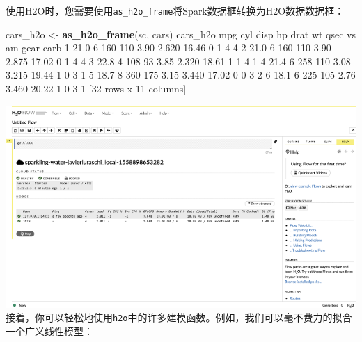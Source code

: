 \documentclass[
]{article}
\newenvironment{Shaded}{\begin{snugshade}}{\end{snugshade}}
\newcommand{\DecValTok}[1]{\textcolor[rgb]{0.00,0.00,0.81}{#1}}
\newcommand{\FloatTok}[1]{\textcolor[rgb]{0.00,0.00,0.81}{#1}}
\newcommand{\KeywordTok}[1]{\textcolor[rgb]{0.13,0.29,0.53}{\textbf{#1}}}
\newcommand{\NormalTok}[1]{#1}
\newcommand{\StringTok}[1]{\textcolor[rgb]{0.31,0.60,0.02}{#1}}
\begin{document}
使用H2O时，您需要使用\texttt{as\_h2o\_frame}将Spark数据框转换为H2O数据数据框：

\begin{Shaded}
\begin{Highlighting}[]
\NormalTok{cars_h2o <-}\StringTok{ }\KeywordTok{as_h2o_frame}\NormalTok{(sc, cars)}
\NormalTok{cars_h2o}
\NormalTok{ mpg cyl disp hp drat wt qsec vs am gear carb}
\DecValTok{1} \FloatTok{21.0} \DecValTok{6} \DecValTok{160} \DecValTok{110} \FloatTok{3.90} \FloatTok{2.620} \FloatTok{16.46} \DecValTok{0} \DecValTok{1} \DecValTok{4} \DecValTok{4}
\DecValTok{2} \FloatTok{21.0} \DecValTok{6} \DecValTok{160} \DecValTok{110} \FloatTok{3.90} \FloatTok{2.875} \FloatTok{17.02} \DecValTok{0} \DecValTok{1} \DecValTok{4} \DecValTok{4}
\DecValTok{3} \FloatTok{22.8} \DecValTok{4} \DecValTok{108} \DecValTok{93} \FloatTok{3.85} \FloatTok{2.320} \FloatTok{18.61} \DecValTok{1} \DecValTok{1} \DecValTok{4} \DecValTok{1}
\DecValTok{4} \FloatTok{21.4} \DecValTok{6} \DecValTok{258} \DecValTok{110} \FloatTok{3.08} \FloatTok{3.215} \FloatTok{19.44} \DecValTok{1} \DecValTok{0} \DecValTok{3} \DecValTok{1}
\DecValTok{5} \FloatTok{18.7} \DecValTok{8} \DecValTok{360} \DecValTok{175} \FloatTok{3.15} \FloatTok{3.440} \FloatTok{17.02} \DecValTok{0} \DecValTok{0} \DecValTok{3} \DecValTok{2}
\DecValTok{6} \FloatTok{18.1} \DecValTok{6} \DecValTok{225} \DecValTok{105} \FloatTok{2.76} \FloatTok{3.460} \FloatTok{20.22} \DecValTok{1} \DecValTok{0} \DecValTok{3} \DecValTok{1}
\NormalTok{[}\DecValTok{32}\NormalTok{ rows x }\DecValTok{11}\NormalTok{ columns]}
\end{Highlighting}
\end{Shaded}

\includegraphics{figures/10_2.png}
接着，你可以轻松地使用\texttt{h2o}中的许多建模函数。例如，我们可以毫不费力的拟合一个广义线性模型：
\end{document}
